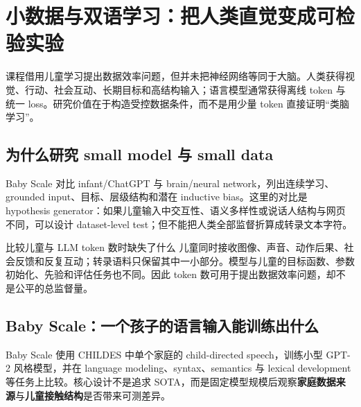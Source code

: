 \section{小数据与双语学习：把人类直觉变成可检验实验}

课程借用儿童学习提出数据效率问题，但并未把神经网络等同于大脑。人类获得视觉、行动、社会互动、长期目标和高结构输入；语言模型通常获得离线 token 与统一 loss。研究价值在于构造受控数据条件，而不是用少量 token 直接证明“类脑学习”。

\subsection{为什么研究 small model 与 small data}

Baby Scale 对比 infant/ChatGPT 与 brain/neural network，列出连续学习、grounded input、目标、层级结构和潜在 inductive bias。这里的对比是 hypothesis generator：如果儿童输入中交互性、语义多样性或说话人结构与网页不同，可以设计 dataset-level test；但不能把人类全部监督折算成转录文本字符。





\begin{warningbox}{比较儿童与 LLM token 数时缺失了什么}
儿童同时接收图像、声音、动作后果、社会反馈和反复互动；转录语料只保留其中一小部分。模型与儿童的目标函数、参数初始化、先验和评估任务也不同。因此 token 数可用于提出数据效率问题，却不是公平的总监督量。
\end{warningbox}

\subsection{Baby Scale：一个孩子的语言输入能训练出什么}

Baby Scale 使用 CHILDES 中单个家庭的 child-directed speech，训练小型 GPT-2 风格模型，并在 language modeling、syntax、semantics 与 lexical development 等任务上比较。核心设计不是追求 SOTA，而是固定模型规模后观察\textbf{家庭数据来源}与\textbf{儿童接触结构}是否带来可测差异。

